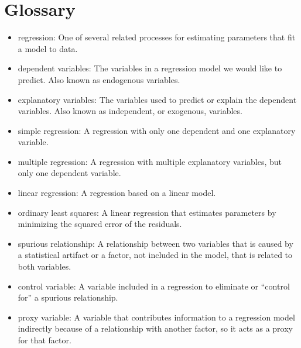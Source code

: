 \section{Glossary}

\begin{itemize}

\item regression: One of several related processes for estimating parameters
that fit a model to data.

\item dependent variables: The variables in a regression model we would
like to predict.  Also known as endogenous variables.

\item explanatory variables: The variables used to predict or explain
the dependent variables.  Also known as independent, or exogenous,
variables.

\item simple regression: A regression with only one dependent and
one explanatory variable.

\item multiple regression: A regression with multiple explanatory
variables, but only one dependent variable.

\item linear regression: A regression based on a linear model.

\item ordinary least squares: A linear regression that estimates
parameters by minimizing the squared error of the residuals.

\item spurious relationship: A relationship between two variables that is 
caused by a statistical artifact or a factor, not included in the
model, that is related to both variables.

\item control variable: A variable included in a regression to
eliminate or ``control for'' a spurious relationship.

\item proxy variable: A variable that contributes information to
a regression model indirectly because of a relationship with another
factor, so it acts as a proxy for that factor.


\end{itemize}
